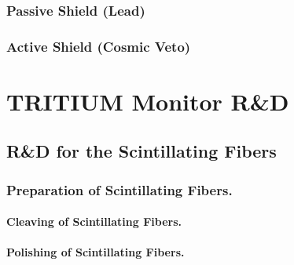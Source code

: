 \documentclass[12pt,a4paper]{book}
\begin{document}
		\subsection{Passive Shield (Lead)}\label{subsec:SetUpPassiveShield}
		
		
		\subsection{Active Shield (Cosmic Veto)}\label{subsec:SetUpActiveShield}
		
		\newpage
					
\chapter{TRITIUM Monitor R\&D}\label{chap:ResearchandDevelopment}
	
	
	\section{R\&D for the Scintillating Fibers}\label{sec:CharacterizationScintillatingFibers}
	
		
		\subsection{Preparation of Scintillating Fibers.}\label{subsec:SurfaceConditioningProcess}
		
				
			\subsubsection{Cleaving of Scintillating Fibers.}\label{subsubsec:CleavingProcess}
			
			
			\subsubsection{Polishing of Scintillating Fibers.}\label{subsubsec:PolishingProcess}
			
			
\end{document}
